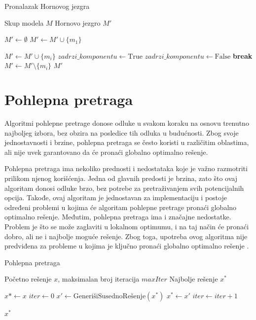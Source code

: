 \documentclass[12pt,oneside]{memoir}
\begin{document}
\begin{algorithm}
    \caption{Pronalazak Hornovog jezgra}
    \renewcommand{\algorithmicrequire}{\textbf{Ulaz:}}
    \renewcommand{\algorithmicensure}{\textbf{Izlaz:}}
    \begin{algorithmic}[1]
        \REQUIRE Skup modela $M$
        \ENSURE Hornovo jezgro $M'$
    
        \STATE $M' \gets \emptyset$ 
        \STATE $M' \gets M' \cup \{m_1\}$
    
            \STATE $M' \gets M' \cup \{m_i\}$
            \STATE $zadrzi\_komponentu \gets \text{True}$
                    \STATE $zadrzi\_komponentu \gets \text{False}$
                    \STATE \textbf{break}
                \ENDIF
            \ENDFOR
                \STATE $M' \gets M' \setminus \{ m_i \}$
            \ENDIF
        \ENDFOR
        \RETURN $M'$
        \end{algorithmic}
\end{algorithm}

\section{Pohlepna pretraga}
Algoritmi pohlepne pretrage donose odluke u svakom koraku na osnovu trenutno najboljeg izbora, bez obzira na posledice tih odluka u budućnosti. Zbog svoje jednostavnosti i brzine, pohlepna pretraga se često koristi u različitim oblastima, ali nije uvek garantovano da će pronaći globalno optimalno rešenje.

Pohlepna pretraga ima nekoliko prednosti i nedostataka koje je važno razmotriti prilikom njenog korišćenja. Jedna od glavnih predosti je brzina, zato što ovaj algoritam donosi odluke brzo, bez potrebe za pretraživanjem svih potencijalnih opcija. Takođe, ovaj algoritam je jednostavan za implementaciju i postoje određeni problemi u kojima će algoritam pohlepne pretrage pronaći globalno optimalno rešenje. Međutim, pohlepna pretraga ima i značajne nedostatke. Problem je što se može zaglaviti u lokalnom optimumu, i na taj način će pronaći dobro, ali ne i najbolje moguće rešenje. Zbog toga, upotreba ovog algoritma nije predviđena za probleme u kojima je ključno pronaći globalno optimalno rešenje \cite{cormen2022}.\\

\begin{algorithm}
\caption{Pohlepna pretraga}
\renewcommand{\algorithmicrequire}{\textbf{Ulaz:}}
\renewcommand{\algorithmicensure}{\textbf{Izlaz:}}
    \begin{algorithmic}[1]
\REQUIRE Početno rešenje $x$, maksimalan broj iteracija $maxIter$
\ENSURE Najbolje rešenje $x^*$

\STATE $x* \gets x$
\STATE $iter \gets 0$
    \STATE $x' \gets \text{GenerišiSusednoRešenje}(x^*)$
        \STATE $x^* \gets x'$
    \ENDIF
    \STATE $iter \gets iter + 1$
\ENDWHILE

\RETURN $x^*$
\end{algorithmic}
\end{algorithm}
\end{document}
